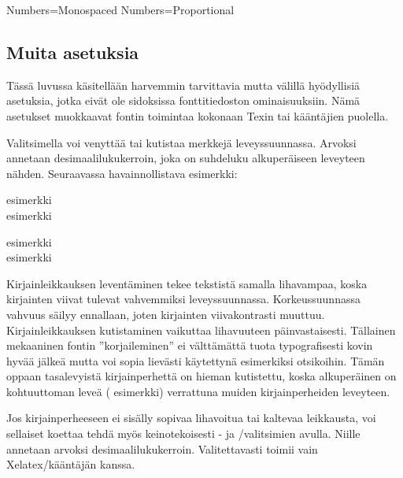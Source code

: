 \begin{koodilohkosis}
  Numbers=Monospaced   %
  Numbers=Proportional %
\end{koodilohkosis}

\subsection{Muita asetuksia}
\label{luku:fontit_muut}

Tässä luvussa käsitellään harvemmin tarvittavia mutta välillä
hyödyllisiä asetuksia, jotka eivät ole sidoksissa fonttitiedoston
ominaisuuksiin. Nämä asetukset muokkaavat fontin toimintaa kokonaan
Texin tai kääntäjien puolella.

Valitsimella%
  voi venyttää tai
kutistaa merkkejä leveyssuunnassa. Arvoksi annetaan
desimaalilukukerroin, joka on suhdeluku alkuperäiseen leveyteen nähden.
Seuraavassa havainnollistava esimerkki:

\begin{koodilohkosis}
  esimerkki \\
  { esimerkki}
\end{koodilohkosis}

\begin{tulossis}
  esimerkki \\
  { esimerkki}
\end{tulossis}

Kirjainleikkauksen leventäminen tekee tekstistä samalla lihavampaa,
koska kirjainten viivat tulevat vahvemmiksi leveyssuunnassa.
Korkeussuunnassa vahvuus säilyy ennallaan, joten kirjainten
viivakontrasti muuttuu. Kirjainleikkauksen kutistaminen vaikuttaa
lihavuuteen päinvastaisesti. Tällainen mekaaninen fontin
''korjaileminen'' ei välttämättä tuota typografisesti kovin hyvää jälkeä
mutta voi sopia lievästi käytettynä esimerkiksi otsikoihin. Tämän oppaan
tasalevyistä kirjainperhettä on hieman kutistettu, koska alkuperäinen on
kohtuuttoman leveä ({\ttfamily{}
  esimerkki}) verrattuna muiden kirjainperheiden leveyteen.

Jos%
  kirjainperheeseen ei
sisälly sopivaa lihavoitua tai kaltevaa leikkausta, voi sellaiset
koettaa tehdä myös keinotekoisesti - ja
\-/valitsimien avulla. Niille annetaan arvoksi
desimaalilukukerroin. Valitettavasti  toimii vain
Xelatex\-/kääntäjän kanssa.

